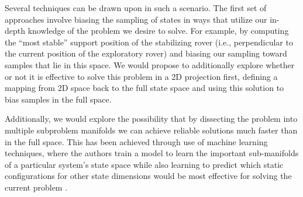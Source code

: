 \documentclass[12pt]{article}
\begin{document}
Several techniques can be drawn upon in such a scenario. The first set of approaches involve biasing the sampling of states 
in ways that utilize our in-depth knowledge of the problem we desire to solve. For example, by computing the ``most stable'' support 
position of the stabilizing rover (i.e., perpendicular to the current position of the exploratory rover) 
and biasing our sampling toward samples that lie in this space. We would propose to additionally explore whether or not 
it is effective to solve this problem in a 2D projection first, defining a mapping from 2D space back to the full state space 
and using this solution to bias samples in the full space. 

Additionally, we would explore the possibility that by dissecting the problem into multiple subproblem manifolds we can achieve reliable 
solutions much faster than in the full space. This has been achieved through use of machine learning techniques, where the authors 
train a model to learn the important sub-manifolds of a particular system's state space while also learning to predict which static 
configurations for other state dimensions would be most effective for solving the current problem \cite{learning_biases}. 









\newpage

\small{}

\end{document}
